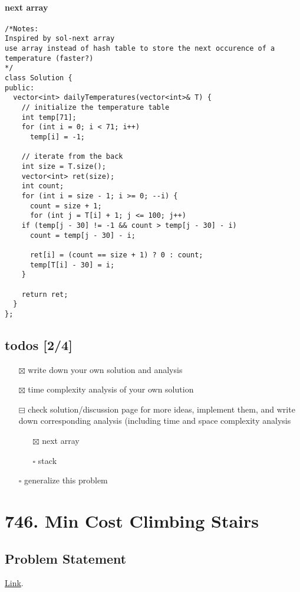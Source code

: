 \documentclass[11pt]{article}
\begin{document}
\paragraph{next array}
\label{sec:orgcd88497}
\begin{verbatim}
/*Notes: 
Inspired by sol-next array
use array instead of hash table to store the next occurence of a temperature (faster?)
*/
class Solution {
public:
  vector<int> dailyTemperatures(vector<int>& T) {
    // initialize the temperature table
    int temp[71];
    for (int i = 0; i < 71; i++)
      temp[i] = -1;

    // iterate from the back
    int size = T.size();
    vector<int> ret(size);
    int count;
    for (int i = size - 1; i >= 0; --i) {
      count = size + 1;
      for (int j = T[i] + 1; j <= 100; j++)
	if (temp[j - 30] != -1 && count > temp[j - 30] - i)
	  count = temp[j - 30] - i;

      ret[i] = (count == size + 1) ? 0 : count;
      temp[T[i] - 30] = i;
    }

    return ret;
  }
};
\end{verbatim}
\subsection{todos [2/4]}
\label{sec:org02437a4}
\begin{itemize}
\item[{$\boxtimes$}] write down your own solution and analysis
\item[{$\boxtimes$}] time complexity analysis of your own solution
\item[{$\boxminus$}] check solution/discussion page for more ideas, implement them, and write down corresponding analysis (including time and space complexity analysis
\begin{itemize}
\item[{$\boxtimes$}] next array
\item[{$\square$}] stack
\end{itemize}
\item[{$\square$}] generalize this problem
\end{itemize}
\section{746. Min Cost Climbing Stairs}
\label{sec:orge49cca5}
\subsection{Problem Statement}
\label{sec:org3d583da}
\href{https://leetcode.com/problems/min-cost-climbing-stairs/}{Link}.
\end{document}
